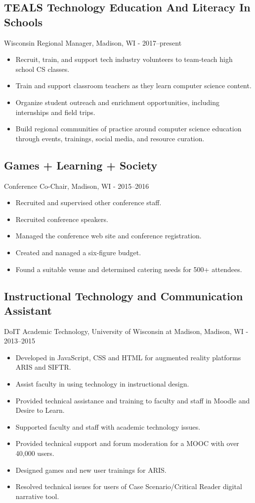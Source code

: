 \documentclass[../main.tex]{subfiles}
\begin{document}
\subsection*{TEALS Technology Education And Literacy In Schools}
     Wisconsin Regional Manager, Madison, WI - 2017--present
	\begin{itemize}
		\item{Recruit, train, and support tech industry volunteers to team-teach high school CS classes.}
		\item{Train and support classroom teachers as they learn computer science content.}
		\item{Organize student outreach and enrichment opportunities, including internships and field trips.}
		\item{Build regional communities of practice around computer science education through events, trainings, social media, and resource curation.}
	\end{itemize}

\subsection*{Games + Learning + Society }
     Conference Co-Chair, Madison, WI - 2015--2016
	\begin{itemize}
		\item{Recruited and supervised other conference staff.}
		\item{Recruited conference speakers.}
		\item{Managed the conference web site and conference registration.}
		\item{Created and nanaged a six-figure budget.}
		\item{Found a suitable venue and determined catering needs for 500+ attendees.}
	\end{itemize}

\subsection*{Instructional Technology and Communication Assistant}
     DoIT Academic Technology, University of Wisconsin at Madison, Madison, WI - 2013--2015
	\begin{itemize}
		\item{Developed in JavaScript, CSS and HTML for augmented reality platforms ARIS and SIFTR.}
		\item{Assist faculty in using technology in instructional design.}
		\item{Provided technical assistance and training to faculty and staff in Moodle and Desire to Learn.}
		\item{Supported faculty and staff with academic technology issues.}
		\item{Provided technical support and forum moderation for a MOOC with over 40,000 users.}
		\item{Designed games and new user trainings for ARIS.}
		\item{Resolved technical issues for users of Case Scenario/Critical Reader digital narrative tool.}
	\end{itemize}
\end{document}
